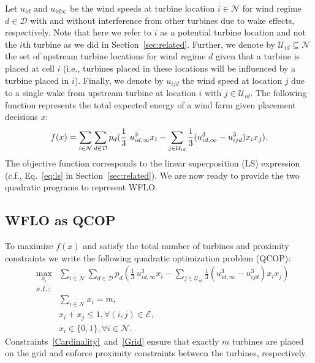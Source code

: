 \documentclass[preprint,12pt]{elsarticle}
\begin{document}
Let $u_{id}$ and $u_{id\infty}$ 
be the wind speeds at turbine location $i \in \mathcal{N}$ for wind regime $d \in \mathcal{D}$
with and without interference from other turbines due to wake effects, respectively. 
Note that here we refer to $i$ as a potential turbine location and not the $i$th turbine as we did in Section~\ref{sec:related}.
Further, we denote by $\mathcal{U}_{id} \subseteq \mathcal{N}$ 
the set of upstream 
turbine locations for wind regime $d$
given that a turbine is placed at cell $i$ (i.e., turbines placed in these locations 
will be influenced by a turbine placed in $i$). Finally,
we denote by $u_{ijd}$ the wind speed at location $j$ due to a single wake from upstream turbine at location $i$ with $j \in \mathcal{U}_{id}$. 
The following function  
represents the total expected energy of a wind farm given placement decisions 
$x$: \begin{equation}
f(x) = \sum_{i \in \mathcal{N}}^{} \sum_{d \in \mathcal{D}}^{} p_d ( \frac{1}{3} \ u_{id, \infty}^3 x_i  - \sum_{j \in \mathcal{U}_{id}}^{} \frac{1}{3}(u_{id, \infty} ^3 - u_{ijd}^3)x_i x_j).   \label{ObjFunc}\\
\end{equation} The objective function corresponds to the linear superposition (LS)
expression (c.f., Eq.~\ref{eq:ls} in Section~\ref{sec:related}). We are now ready to provide the two quadratic programs to represent WFLO.

\subsection{WFLO as QCOP}

To 
maximize $f(x)$ and satisfy the total number of turbines and proximity 
constraints we write
the following quadratic optimization problem (QCOP):
\begin{eqnarray} \label{QCOP}
&\max_{x_i}^{}& \sum_{i \in \mathcal{N}}^{} \sum_{d \in \mathcal{D}}^{} p_d ( \frac{1}{3} \ u_{id, \infty}^3 x_i  - \sum_{j \in \mathcal{U}_{id}}^{} \frac{1}{3}(u_{id, \infty} ^3 - u_{ijd}^3)x_i x_j)   \\
&s.t.:& \nonumber\\
&\mbox{       }& \sum_{i \in \mathcal{N}}^{} x_i = m,\label{Cardinality}\\
&\mbox{       }& x_i + x_j \leq 1,   \forall (i,j) \in \mathcal{E}, \label{Grid}\\
&\mbox{       }& x_i \in \{0,1\},     \forall i \in \mathcal{N}.
\end{eqnarray} Constraints~\ref{Cardinality}~and~\ref{Grid} ensure that exactly $m$ turbines are placed on the grid
and enforce proximity constraints between the turbines, respectively. 
\end{document}
